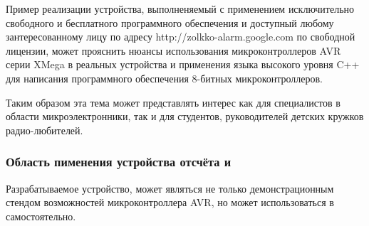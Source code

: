 \begin{par}
Пример реализации устройства, выполненяемый с применением исключительно свободного и бесплатного
программного обеспечения и доступный любому зантересованному лицу по адресу http://zolkko-alarm.google.com
по свободной лицензии, может прояснить нюансы использования микроконтроллеров AVR серии
XMega в реальных устройства и применения языка высокого уровня C++ для написания программного
обеспечения 8-битных микроконтроллеров.
\end{par}

\begin{par}
Таким образом эта тема может представлять интерес как для специалистов в области микроэлектронники,
так и для студентов, руководителей детских кружков радио-любителей.
\end{par}

\subsubsection{Область пименения устройства отсчёта и }
Разрабатываемое устройство, может являться не только демонстрационным стендом возможностей микроконтроллера AVR,
но может использоваться в самостоятельно.

\newpage{}
